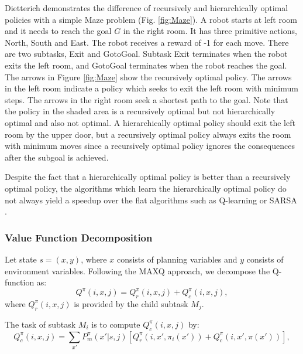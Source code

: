 Dietterich \cite{MaxQJ} demonstrates the difference of recursively and hierarchically optimal policies 
with a simple Maze problem (Fig. \ref{fig:Maze}). A robot starts at left room and it needs to reach 
the goal $G$ in the right room. It has three primitive actions, North, South and East.  
The robot receives a reward of -1 for each move.
There are two subtasks, Exit and GotoGoal. Subtask Exit terminates when the robot exits the left room,
and GotoGoal terminates when the robot reaches the goal. The arrows in Figure \ref{fig:Maze} show the 
recursively optimal policy. The arrows in the left room indicate a policy which seeks to exit
the left room with minimum steps. The arrows in the right room seek a shortest path to the goal.
Note that the policy in the shaded area is a recursively optimal but not hierarchically optimal and also not
optimal. A hierarchically optimal policy should exit the left room by the upper door, but a recursively 
optimal policy always exits the room with minimum moves since
a recursively optimal policy ignores the consequences after the subgoal is achieved. 

Despite the fact that a hierarchically optimal policy is better than a recursively optimal policy, 
the algorithms which learn the hierarchically optimal policy do not always yield a speedup over
the flat algorithms such as Q-learning or SARSA \cite{MaxQJ, Andre02}. 

\subsubsection{Value Function Decomposition}

Let state $s = (x, y)$, where $x$ consists of planning variables and $y$ consists of environment
variables. Following the MAXQ approach, we decompose the Q-function as:
\begin{equation}
    Q^{\pi}(i, x, j) = Q_r^{\pi}(i, x, j) + Q_c^{\pi}(i, x, j),
    \label{eq:biasedMaxQ}
\end{equation}
where $Q_r^{\pi}(i, x, j)$ is provided by the child subtask $M_j$.

The task of subtask $M_i$ is to compute $Q_c^{\pi}(i, x, j)$ by:
\begin{equation}
    Q_c^{\pi}(i, x, j) = \sum_{x'} P_m^{\pi}(x'|s, j)[Q_r^{\pi}(i, x', \pi_i(x')) + Q_c^{\pi}(i, x', \pi(x'))],
    \label{eq:biasedQc}
\end{equation}

